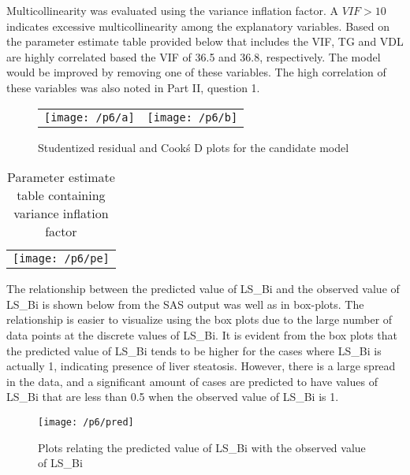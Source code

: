 \documentclass{article}
\begin{document}
Multicollinearity was evaluated using the variance inflation factor. A $VIF > 10$ indicates excessive multicollinearity among the explanatory variables. Based on the parameter estimate table provided below that includes the VIF, TG and VDL are highly correlated based the VIF of 36.5 and 36.8, respectively. The model would be improved by removing one of these variables. The high correlation of these variables was also noted in Part II, question 1. 

\begin{figure}[H]
\centering
\begin{tabular}{c c}
\begin{minipage}{.33\textwidth}
\centering
\texttt{[image: /p6/a]}
\end{minipage}
&
\begin{minipage}{.33\textwidth}
\centering
\texttt{[image: /p6/b]}
\end{minipage}
\end{tabular}
\caption{Studentized residual and Cook\' s D plots for the candidate model} \label{cook} 
\end{figure}


\begin{table}[H]
	\centering
	\caption{Parameter estimate table containing variance inflation factor} \label{pe} 
	\begin{tabular}{c}
	\begin{minipage}{.99\textwidth}
	\centering
	\texttt{[image: /p6/pe]}
	\end{minipage}
	\end{tabular}
\end{table}

The relationship between the predicted value of LS\_Bi and the observed value of LS\_Bi is shown below from the SAS output was well as in box-plots. The relationship is easier to visualize using the box plots due to the large number of data points at the discrete values of LS\_Bi. It is evident from the box plots that the predicted value of LS\_Bi tends to be higher for the cases where LS\_Bi is actually 1, indicating presence of liver steatosis.   However, there is a large spread in the data, and a significant amount of cases are predicted to have values of LS\_Bi that are less than 0.5 when the observed value of LS\_Bi is 1. 

\begin{minipage}{\textwidth}
	\begin{figure}[H]
	\centering
	\texttt{[image: /p6/pred]}
	\caption{Plots relating the predicted value of LS\_Bi with the observed value of LS\_Bi}
	\end{figure}
\end{minipage}
\end{document}
